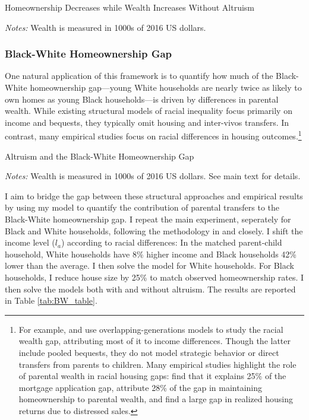 \documentclass[12pt]{article}
\begin{document}
\begin{table}[tb]
	\center 
	\begin{threeparttable}
		\caption{Homeownership Decreases while Wealth Increases Without Altruism}\label{tab:modelfitnoa}
		
		\footnotesize
		\textit{Notes:} Wealth is measured in 1000s of 2016 US dollars.
	\end{threeparttable}
\end{table}

\subsubsection{Black-White Homeownership Gap}\label{sec:bwgap}
One natural application of this framework is to quantify how much of the Black-White homeownership gap---young White households are nearly twice as likely to own homes as young Black households---is driven by differences in parental wealth. While existing structural models of racial inequality focus primarily on income and bequests, they typically omit housing and inter-vivos transfers. In contrast, many empirical studies focus on racial differences in housing outcomes.\footnote{For example, \citet{Ashman2020} and \citet{aliprantis2022dynamics} use overlapping-generations models to study the racial wealth gap, attributing most of it to income differences. Though the latter include pooled bequests, they do not model strategic behavior or direct transfers from parents to children. Many empirical studies highlight the role of parental wealth in racial housing gaps: \citet{charles2002transition} find that it explains 25\% of the mortgage application gap,  \citet{bond2021role} attribute 28\% of the gap in maintaining homeownership to parental wealth, and \citet{kermani2021racial} find a large gap in realized housing returns due to distressed sales.}

\begin{table}
	\center
\begin{threeparttable}[tb]
				\singlespacing
		\caption{Altruism and the Black-White Homeownership Gap}\label{tab:BW_table}
		
		\footnotesize
		\textit{Notes:} Wealth is measured in 1000s of 2016 US dollars. See main text for details.
	\end{threeparttable}
\end{table}


I aim to bridge the gap between these structural approaches and empirical results by using my model to quantify the contribution of parental transfers to the Black-White homeownership gap. I repeat the main experiment, seperately for Black and White households, following the methodology in \cite{Ashman2020} and \cite{aliprantis2022dynamics} closely. I shift the income level ($l_a$) according to racial differences: In the matched parent-child household, White households have 8\% higher income and Black households 42\% lower than the average. I then solve the model for White households. For Black households, I reduce house size by 25\% to match observed homeownership rates. I then solve the models both with and without altruism. The results are reported in Table \ref{tab:BW_table}. 
\end{document}
